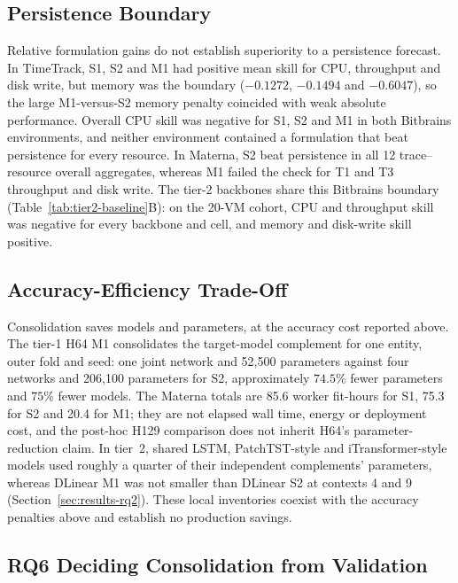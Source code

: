 \documentclass[5p,twocolumn]{elsarticle}
\begin{document}
\subsection{Persistence Boundary}
\label{sec:results-persistence}

Relative formulation gains do not establish superiority to a persistence
forecast. In TimeTrack, S1, S2 and M1 had positive mean skill for CPU,
throughput and disk write, but memory was the boundary ($-0.1272$, $-0.1494$
and $-0.6047$), so the large M1-versus-S2 memory penalty coincided with weak
absolute performance. Overall CPU skill was negative for S1, S2 and M1 in both
Bitbrains environments, and neither environment contained a formulation that
beat persistence for every resource. In Materna, S2 beat persistence in all 12
trace--resource overall aggregates, whereas M1 failed the check for T1 and T3
throughput and disk write.
The tier-2 backbones share this Bitbrains boundary
(Table~\ref{tab:tier2-baseline}B): on the 20-VM cohort, CPU and throughput
skill was negative for every backbone and cell, and memory and disk-write
skill positive.

\subsection{Accuracy-Efficiency Trade-Off}
\label{sec:results-efficiency}

Consolidation saves models and parameters, at the accuracy cost reported
above. The tier-1 H64 M1 consolidates the target-model complement for one entity,
outer fold and seed: one joint network and
52,500 parameters against four networks and 206,100 parameters for S2,
approximately $74.5\%$ fewer parameters and $75\%$ fewer models. The
Materna totals are 85.6 worker fit-hours for S1, 75.3 for S2 and
20.4 for M1; they are not elapsed wall time, energy or deployment cost,
and the post-hoc H129 comparison does not inherit H64's parameter-reduction
claim. In tier~2, shared LSTM, PatchTST-style and iTransformer-style models
used roughly a quarter of their independent complements' parameters, whereas
DLinear M1 was not smaller than DLinear S2 at contexts 4 and 9
(Section~\ref{sec:results-rq2}). These local inventories coexist with the
accuracy penalties above and establish no production savings.


\subsection{RQ6 Deciding Consolidation from Validation}
\label{sec:results-a3}
\end{document}
